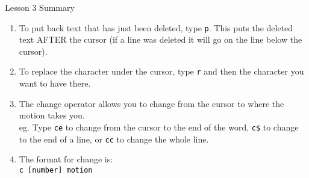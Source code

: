 \documentclass[handout, 10pt]{beamer}
\newcommand{\code}[2][black]{\textcolor{#1}{\colorbox{codegray}{\texttt{#2}}}}
\begin{document}
\begin{frame}{Lesson 3 Summary}
	\begin{enumerate}
		\item To put back text that has just been deleted, type \code{p}. This
			puts the	deleted text AFTER the cursor (if a line was deleted it
			will go on the line below the cursor).

		\item To replace the character under the cursor, type \code{r} and then
			the character you want to have there.

		\item The change operator allows you to change from the cursor to where
			the	motion takes you. \\
			eg. Type \code{ce} to change from the cursor to the end of the
			word, \code{c\$} to change to the end of a line, or \code{cc} to
			change the whole line.

		\item  The format for change is: \\
		\code{c  [number]  motion}
	\end{enumerate}
\end{frame}
\end{document}
